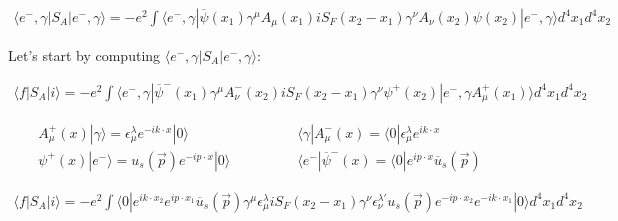 \documentclass[a4]{article}
\begin{document}
\begin{framed}
            \begin{equation}
                \begin{aligned}
                    \langle e^{-}, \gamma | S_{A} | e^{-}, \gamma \rangle = - e^{2} \int \langle e^{-}, \gamma |\overline{\psi} (x_1) \gamma^{\mu} A_{\mu} (x_1) i S_{F} (x_2 - x_1) \gamma^{\nu} A_{\nu} (x_2) \psi (x_2)| e^{-}, \gamma \rangle d^{4} x_{1} d^{4} x_{2}
                \end{aligned}
            \end{equation}

            Let's start by computing $\langle e^{-}, \gamma | S_{A} | e^{-}, \gamma \rangle$:

            \begin{equation}
                \begin{aligned}
                    \langle f | S_{A} | i \rangle = - e^{2} \int \langle e^{-}, \gamma |\overline{\psi}^{-} (x_1) \gamma^{\mu} A_{\nu}^{-} (x_2) i S_{F} (x_2 - x_1) \gamma^{\nu}  \psi^{+} (x_2)| e^{-}, \gamma A_{\mu}^{+} (x_1) \rangle d^{4} x_{1} d^{4} x_{2}
                \end{aligned}
            \end{equation}

            \begin{equation}
                \begin{aligned}
                    A_{\mu}^{+} (x) | \gamma \rangle = \epsilon_{\mu}^{\lambda} e^{- i k \cdot x} | 0 \rangle \qquad & \qquad \langle \gamma | A_{\mu}^{-} (x) = \langle 0 | \epsilon_{\mu}^{\lambda} e^{i k \cdot x} \\
                    \psi^{+} (x) | e^{-} \rangle = u_{s} (\vec{p}) e^{- i p \cdot x}  | 0 \rangle \qquad & \qquad \langle e^{-} | \overline{\psi}^{-} (x) = \langle 0 | e^{i p \cdot x} \overline{u}_{s} (\vec{p})
                \end{aligned}
            \end{equation}

            \begin{equation}
                \begin{aligned}
                    \langle f | S_{A} | i \rangle = - e^{2} \int \langle 0 | e^{i k \cdot x_2} e^{i p \cdot x_1} \overline{u}_{s} (\vec{p}) \gamma^{\mu} \epsilon_{\mu}^{\lambda} i S_{F} (x_2 - x_1) \gamma^{\nu} \epsilon_{\nu}^{\lambda'} u_{s} (\vec{p}) e^{- i p \cdot x_2} e^{- i k \cdot x_1} | 0 \rangle d^{4} x_{1} d^{4} x_{2}
                \end{aligned}
            \end{equation}


\end{framed}
\end{document}
